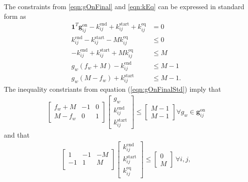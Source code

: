 The constraints from \eqref{eqn:gOnFinal} and \eqref{eqn:kEq} can be expressed in standard form as 
\begin{equation} \label{eqn:gOnFinalStd}\begin{aligned}
	\mathbf{1}^T\mathbf{g}_{ij}^{\text{on}} - k_{ij}^{\text{end}} + k_{ij}^{\text{start}} + k_{ij}^{\text{eq}} &=  0 \\
	k_{ij}^{\text{end}} - k_{ij}^{\text{start}} - M k_{ij}^{\text{eq}} &\le 0 \\
	-k_{ij}^{\text{end}} + k_{ij}^{\text{start}} + M k_{ij}^{\text{eq}} &\le M \\
	g_w\left (f_w + M \right) - k_{ij}^{\text{end}} &\le M - 1 \\
	g_w\left (M - f_w\right) + k_{ij}^{\text{start}} &\le M - 1.
\end{aligned}\end{equation}
The inequality constriants from equation (\ref{eqn:gOnFinalStd}) imply that
\begin{equation} \label{eqn:gOnFinalPart1}\begin{aligned}
	\begin{bmatrix}f_w + M & -1 & 0\\
		       M - f_w & 0 & 1 
	\end{bmatrix} 
	\begin{bmatrix}g_w                 \\
		       k_{ij}^{\text{end}} \\ 
		       k_{ij}^{\text{start}}
	\end{bmatrix} \le
	\begin{bmatrix} M - 1 \\
	                M - 1 
	\end{bmatrix} \forall g_w \in \mathbf{g}_{ij}^{\text{on}}
\end{aligned}\end{equation} 
and that
\begin{equation} \label{eqn:kEqStd}\begin{aligned}
	\begin{bmatrix}1 & -1 & -M \\
		       -1 & 1 & M  \\
		       \end{bmatrix} \begin{bmatrix}k_{ij}^{\text{end}} \\ k_{ij}^{\text{start}} \\ k_{ij}^{\text{eq}} \end{bmatrix} \le \begin{bmatrix} 0 \\ M\end{bmatrix} \ \forall i,j,
\end{aligned} \end{equation}
